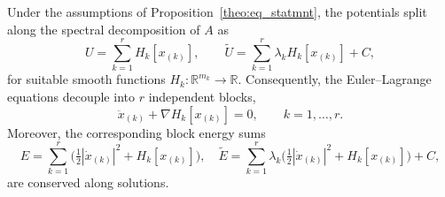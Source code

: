 \documentclass{rendiconti}
\begin{document}
%
\begin{theorem}
\label{th:weak}
Under the assumptions of Proposition~\ref{theo:eq_statmnt}, the potentials split
along the spectral decomposition of $A$ as
\begin{equation}
\label{eq:weak-potentials}
U=\sum_{k=1}^r H_k[x_{(k)}],
\qquad
\widetilde U=\sum_{k=1}^r \lambda_k H_k[x_{(k)}]+C,
\end{equation}
for suitable smooth functions $H_k:\mathbb{R}^{m_k}\to\mathbb{R}$. Consequently,
the Euler--Lagrange equations decouple into $r$ independent blocks,
\begin{equation}
\label{eq:weak-eom}
\ddot x_{(k)}+\nabla H_k[x_{(k)}]=0,
\qquad k=1,\dots,r.
\end{equation}
Moreover, the corresponding block energy sums
\begin{equation}
\label{eq:weak-energies}
E=\sum_{k=1}^r\!\Big(\tfrac12|\dot x_{(k)}|^2+H_k[x_{(k)}]\Big),
\quad
\widetilde E=\sum_{k=1}^r \lambda_k\!\Big(\tfrac12|\dot x_{(k)}|^2+H_k[x_{(k)}]\Big)+C,
\end{equation}
are conserved along solutions.
\end{theorem}
%
\end{document}
